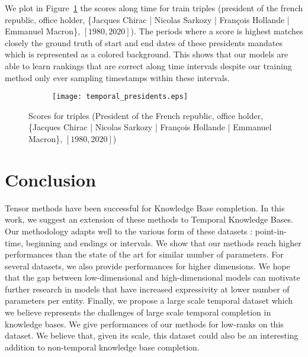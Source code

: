 \documentclass{article}
\begin{document}
We plot in Figure~\ref{fig:qualitative} the scores along time for train triples (president of the french republic, office holder, \{Jacques Chirac | Nicolas Sarkozy | François Hollande | Emmanuel Macron\}, $[1980,2020]$). The periods where a score is highest matches closely the ground truth of start and end dates of these presidents mandates which is represented as a colored background. This shows that our models are able to learn rankings that are correct along time intervals despite our training method only ever sampling timestamps within these intervals.
\vspace{-3mm}
\begin{figure}[t]
    \centering
    \begin{subfigure}[b]{0.7\textwidth}
      \centering \texttt{[image: temporal\_presidents.eps]}
    \end{subfigure}
    \caption{Scores for triples (President of the French republic, office holder, \{Jacques Chirac | Nicolas Sarkozy | François Hollande | Emmanuel Macron\}, $[1980,2020]$)}
    \label{fig:qualitative}
\vspace{-3mm}    
\end{figure}

\section{Conclusion}
Tensor methods have been successful for Knowledge Base completion. In this work, we suggest an extension of these methods to Temporal Knowledge Bases. Our methodology adapts well to the various form of these datasets : point-in-time, beginning and endings or intervals. We show that our methods reach higher performances than the state of the art for similar number of parameters. For several datasets, we also provide performances for higher dimensions. We hope that the gap between low-dimensional and high-dimensional models can motivate further research in models that have increased expressivity at lower number of parameters per entity. Finally, we propose a large scale temporal dataset which we believe represents the challenges of large scale temporal completion in knowledge bases. We give performances of our methods for low-ranks on this dataset. We believe that, given its scale, this dataset could also be an interesting addition to non-temporal knowledge base completion.


\newpage



\clearpage
\end{document}
